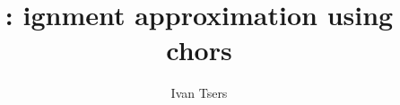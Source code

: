 \documentclass[a4paper]{article}
\begin{document}
\pagestyle{noweb}

\title{: ignment approximation using chors}
\author{Ivan Tsers}
\maketitle
\tableofcontents



%

%
\end{document}
